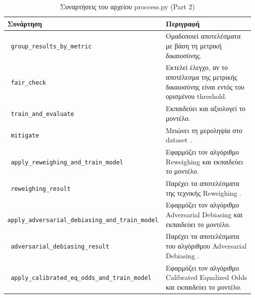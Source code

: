 \documentclass[12pt,twoside]{article}
\newcommand{\en}{\selectlanguage{english}}
\newcommand{\gr}{\selectlanguage{greek}}
\begin{document}
\newpage
\begin{table}[H]
\centering
\caption{\gr Συναρτήσεις του αρχείου \en proccess.py (Part 2)}
\begin{tabular}{|p{7cm}|p{7cm}|}
\hline
\textbf{\gr Συνάρτηση} & \textbf{\gr Περιγραφή} \\ \hline
\texttt{ \en group\_results\_by\_metric} & \gr Ομαδοποιεί αποτελέσματα με βάση τη μετρική δικαιοσύνης. \\ \hline
\texttt{ \en fair\_check} & \gr Εκτελεί έλεγχο, αν το αποτέλεσμα της μετρικής δικαιοσύνης είναι εντός του ορισμένου \en threshold\gr. \\ \hline
\texttt{ \en train\_and\_evaluate} & \gr Εκπαιδεύει και αξιολογεί το μοντέλο. \\ \hline
\texttt{ \en mitigate} & \gr Μειώνει τη μεροληψία στο \en dataset \gr. \\ \hline
\texttt{ \en apply\_reweighing\_and\_train\_model} & \gr Εφαρμόζει τον αλγόριθμο \en Reweighing \gr και εκπαιδεύει το μοντέλο. \\ \hline
\texttt{ \en reweighing\_result} & \gr Παρέχει τα αποτελέσματα της τεχνικής \en Reweighing \gr. \\ \hline
\texttt{ \en apply\_adversarial\_debiasing\_\allowbreak and\_train\_model} & \gr Εφαρμόζει τον αλγόριθμο \en Adversarial Debiasing \gr και εκπαιδεύει το μοντέλο. \\ \hline
\texttt{ \en adversarial\_debiasing\_result} & \gr Παρέχει τα αποτελέσματα του αλγόριθμου \en Adversarial Debiasing \gr. \\ \hline
\texttt{ \en apply\_calibrated\_eq\_odds\_\allowbreak and\_train\_model} & \gr Εφαρμόζει τον αλγόριθμο \en Calibrated Equalized Odds \gr και εκπαιδεύει το μοντέλο. \\ \hline
\end{tabular}
\end{table}
\end{document}
